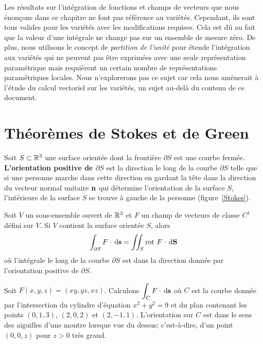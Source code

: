 {Les résultats sur l'intégration de fonctions et champs de vecteurs que
nous énonçons dans ce chapitre ne font pas référence au variétés.
Cependant, ils sont tous valides pour les variétés avec les
modifications requises.  Cela est dû au fait que la valeur d'une
intégrale ne change pas sur un ensemble de \lgm mesure zéro\rgm.  De
plus, nous utilisons le concept de {\em partition de l'unité} pour étende
l'intégration aux variétés qui ne peuvent pas être exprimées avec une
seule représentation paramétrique mais requièrent un certain nombre de
représentations paramétriques locales.  Nous n'explorerons pas ce
sujet car cela nous amènerait à l'étude du calcul vectoriel sur les
variétés, un sujet au-delà du contenu de ce document.

\section{Théorèmes de Stokes et de Green}

Soit $S \subset \mathbb{R}^3$ une surface orientée dont la frontière
$\partial S$ est une courbe fermée.  {\bfseries L'orientation positive
de $\partial S$} est la direction le long de la courbe $\partial S$
telle que si une personne marche dans cette direction en gardant la
tête dans la direction du vecteur normal unitaire $\mathbf{n}$ qui
détermine l'orientation de la surface $S$, l'intérieure de la surface
$S$ se trouve à gauche de la personne (figure~\ref{Stokes}).

\begin{focus}{\thm}
Soit $V$ un sous-ensemble ouvert de $\mathbb{R}^3$ et $F$ un champ de
vecteurs de classe $C^1$ défini sur $V$.  Si $V$ contient la surface
orientée $S$, alors
\begin{equation} \label{Stokes_equ}
\int_{\partial S} F\cdot \,\mathrm{d}\mathbf{s}
= \iint_S \operatorname{rot}\,F \cdot \,\mathrm{d}\mathbf{S}
\end{equation}
où l'intégrale le long de la courbe $\partial S$ est dans la direction 
donnée par l'orientation positive de $\partial S$.
\end{focus}


\begin{egg}
Soit $F(x,y,z) = (xy, yz, xz)$.  Calculons
$\displaystyle \int_C F \cdot \,\mathrm{d}\mathbf{s}$
où $C$ est la courbe donnée par l'intersection du cylindre d'équation
$x^2 + y^2 =9$ et du plan contenant les points $(0,1,3)$, $(2,0,2)$ et
$(2,-1,1)$.  L'orientation sur $C$ est dans le sens des aiguilles
d'une montre lorsque vue du dessus; c'est-à-dire, d'un point $(0,0,z)$
pour $z>0$ très grand.


\end{egg}}
